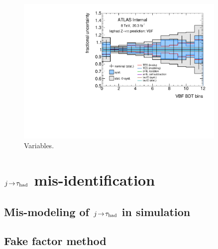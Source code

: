 \begin{figure}[tp]
  \includegraphics[width=0.90\textwidth]{figures/uncertainties/uncertainties_lephad_paper14_8TeV_Ztautau_VBF}
  \caption{Variables.}
  \label{fig:backgrounds-uncertainties-Ztautau}
\end{figure}

\clearpage
\section{$j\!\rightarrow\!\tau_\text{had}$ mis-identification}
\label{sec:backgrounds-misid}

\subsection{Mis-modeling of $j\!\rightarrow\!\tau_\text{had}$ in simulation}

\subsection{Fake factor method}

